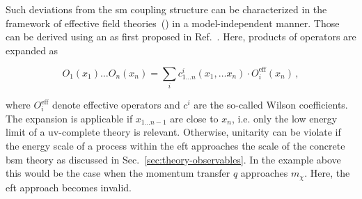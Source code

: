 
Such deviations from the \gls{sm} coupling structure can be characterized in the framework of effective field theories~() in a model-independent manner. Those can be derived using an  as first proposed in Ref.~\cite{Wilson:1972ee}. Here, products of operators are expanded as

\begin{equation}
{O}_{1}(x_{1})\ldots {O}_{n}(x_{n})=\sum_{i}c_{1\ldots n}^{i}(x_{1},\ldots x_{n})\cdot{O}_{i}^\mathrm{eff}(x_{n})\,,
\end{equation}

where $O_{i}^\mathrm{eff}$ denote effective operators and $c^{i}$ are the so-called Wilson coefficients. The expansion is applicable if $x_{1\ldots n-1}$ are close to $x_n$, i.e. only the low energy limit of a \gls{uv}-complete theory is relevant. Otherwise, unitarity can be violate if the energy scale of a process within the \gls{eft} approaches the scale of the concrete \gls{bsm} theory as discussed in Sec.~\ref{sec:theory-observables}. In the example above this would be the case when the momentum transfer $q$ approaches $m_\chi$. Here, the \gls{eft} approach becomes invalid.

